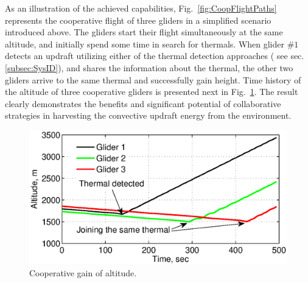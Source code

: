 \documentclass{ifacconf}
\newcommand{\squeezeup}{\vspace{-3.0mm}}
\begin{document}
As an illustration of the achieved capabilities,
Fig.~\ref{fig:CoopFlightPaths} represents the cooperative flight of three
gliders in a simplified scenario introduced above. The gliders start their
flight simultaneously at the same altitude, and initially spend some time in
search for thermals. When glider $\#1$ detects an updraft utilizing either of
the thermal detection approaches ( see sec.\ref{subsec:SysID}), and shares
the information about the thermal, the other two gliders arrive to the same
thermal and successfully gain height. Time history of the altitude of three
cooperative gliders is presented next in Fig.~\ref{fig:CoopFlightHeight}. The
result clearly demonstrates the benefits and significant potential of
collaborative strategies in harvesting the convective updraft energy from the
environment.\squeezeup
\begin{figure}[thpb]
  \centering
  \includegraphics[scale=0.39]{Figures/Coop_gain_altitude_2.eps}
  \caption{Cooperative gain of altitude.}
  \label{fig:CoopFlightHeight}
\end{figure}

\end{document}
